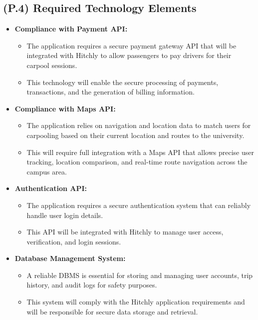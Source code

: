 \documentclass[12pt,letterpaper]{article}
\begin{document}
\subsection{(P.4) Required Technology Elements}
\begin{itemize}
  \item \textbf{Compliance with Payment API:}
  \begin{itemize}
      \item The application requires a secure payment gateway API that will be integrated with Hitchly to allow passengers to pay drivers for their carpool sessions. 
      \item This technology will enable the secure processing of payments, transactions, and the generation of billing information.
  \end{itemize}

  \item \textbf{Compliance with Maps API:}
  \begin{itemize}
      \item The application relies on navigation and location data to match users for carpooling based on their current location and routes to the university. 
      \item This will require full integration with a Maps API that allows precise user tracking, location comparison, and real-time route navigation across the campus area.
  \end{itemize}

  \item \textbf{Authentication API:}
  \begin{itemize}
      \item The application requires a secure authentication system that can reliably handle user login details. 
      \item This API will be integrated with Hitchly to manage user access, verification, and login sessions.
  \end{itemize}

  \item \textbf{Database Management System:}
  \begin{itemize}
      \item A reliable DBMS is essential for storing and managing user accounts, trip history, and audit logs for safety purposes. 
      \item This system will comply with the Hitchly application requirements and will be responsible for secure data storage and retrieval.
  \end{itemize}
\end{itemize}
\end{document}
